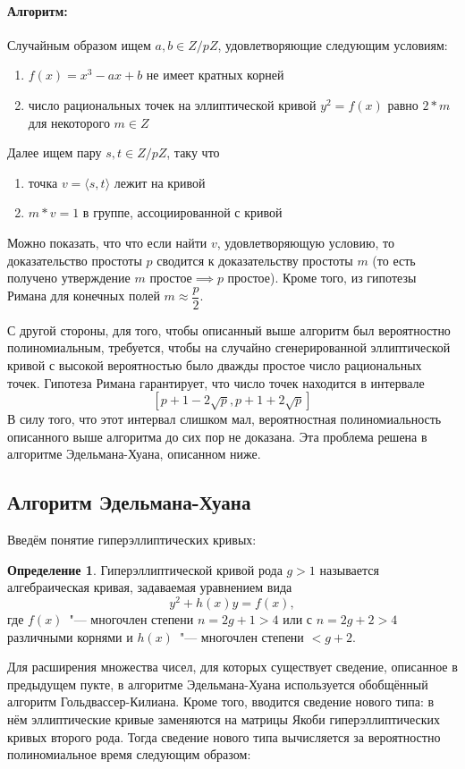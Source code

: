 \documentclass[12pt]{article}
\theoremstyle{definition}
\newtheorem{Def}{Определение}
\numberwithin{Def}{section}
\numberwithin{Th}{section}
\numberwithin{St}{section}
\numberwithin{Cor}{section}
\begin{document}
\paragraph{Алгоритм:} Случайным образом ищем $a,b\in Z/pZ$, удовлетворяющие
следующим условиям:
\begin{enumerate}[(1)]
	\item $f(x)=x^3-ax+b$ не имеет кратных корней
	\item число рациональных точек на эллиптической кривой $y^2=f(x)$ равно
	$2*m$ для некоторого $m\in Z$
\end{enumerate}
Далее ищем пару $s,t\in Z/pZ$, таку что
\begin{enumerate}[(1)]
	\item точка $v=\langle s,t\rangle$ лежит на кривой
	\item $m*v=1$ в группе, ассоциированной с кривой
\end{enumerate}

Можно показать, что что если найти $v$, удовлетворяющую условию, то
доказательство простоты $p$ сводится к доказательству простоты $m$ (то есть
получено утверждение $m\text{ простое}\implies p\text{ простое}$). Кроме того,
из гипотезы Римана для конечных полей $m\approx\dfrac p2$.

С другой стороны, для того, чтобы описанный выше алгоритм был вероятностно
полиномиальным, требуется, чтобы на случайно сгенерированной эллиптической кривой
с высокой вероятностью было дважды простое число рациональных точек. Гипотеза
Римана гарантирует, что число точек находится в интервале
$$
[p+1-2\sqrt{p},p+1+2\sqrt{p}]
$$
В силу того, что этот интервал слишком мал, вероятностная полиномиальность
описанного выше алгоритма до сих пор не доказана. Эта проблема решена в алгоритме
Эдельмана-Хуана, описанном ниже.

\subsection{Алгоритм Эдельмана-Хуана}

Введём понятие гиперэллиптических кривых:

\begin{Def}
	Гиперэллиптической кривой рода $g>1$ называется алгебраическая кривая,
	задаваемая уравнением вида
	$$
	y^2+h(x)y=f(x),
	$$
	где $f(x)$~"--- многочлен степени $n=2g+1>4$ или с $n=2g+2>4$ различными
	корнями и $h(x)$~"--- многочлен степени $<g+2$.
\end{Def}

Для расширения множества чисел, для которых существует сведение, описанное
в предыдущем пукте, в алгоритме Эдельмана-Хуана используется обобщённый
алгоритм Гольдвассер-Килиана. Кроме того, вводится сведение нового типа:
в нём эллиптические кривые заменяются на матрицы Якоби гиперэллиптических
кривых второго рода. Тогда сведение нового типа вычисляется за вероятностно
полиномиальное время следующим образом:
\end{document}
